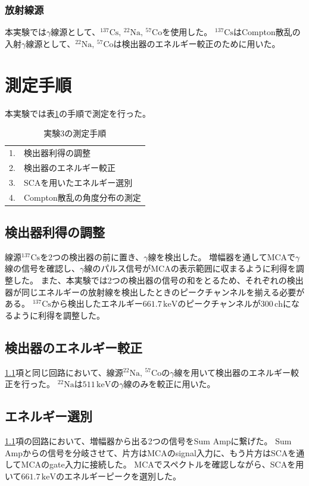 \documentclass[11pt, titlepage, openany]{ltjsbook}
\begin{document}
\subsubsection{放射線源}
本実験では$\gamma$線源として、$\mathrm{^{137}Cs,\,^{22}Na,\,^{57}Co}$を使用した。
$^{137}\mathrm{Cs}$はCompton散乱の入射$\gamma$線源として、$^{22}\mathrm{Na},\,^{57}\mathrm{Co}$は検出器のエネルギー較正のために用いた。
\section{測定手順}
本実験では表\ref{flow3}の手順で測定を行った。
\begin{table}[H]
    \centering
    \begin{tabular}{cl}
        1. & 検出器利得の調整 \\
        2. & 検出器のエネルギー較正 \\
        3. & SCAを用いたエネルギー選別 \\
        4. & Compton散乱の角度分布の測定
    \end{tabular}
    \caption{実験3の測定手順}
    \label{flow3}
\end{table}
\subsection{検出器利得の調整}
\label{gain-adjust}
線源$^{137}\mathrm{Cs}$を2つの検出器の前に置き、$\gamma$線を検出した。
増幅器を通してMCAで$\gamma$線の信号を確認し、$\gamma$線のパルス信号がMCAの表示範囲に収まるように利得を調整した。
また、本実験では2つの検出器の信号の和をとるため、それぞれの検出器が同じエネルギーの放射線を検出したときのピークチャンネルを揃える必要がある。
$^{137}\mathrm{Cs}$から検出したエネルギー$661.7\,\mathrm{keV}$のピークチャンネルが$300\,\mathrm{ch}$になるように利得を調整した。
\subsection{検出器のエネルギー較正}
\ref{gain-adjust}項と同じ回路において、線源$^{22}\mathrm{Na},\,^{57}\mathrm{Co}$の$\gamma$線を用いて検出器のエネルギー較正を行った。
$^{22}\mathrm{Na}$は$511\,\mathrm{keV}$の$\gamma$線のみを較正に用いた。
\subsection{エネルギー選別}
\ref{gain-adjust}項の回路において、増幅器から出る2つの信号をSum Ampに繋げた。
Sum Ampからの信号を分岐させて、片方はMCAのsignal入力に、もう片方はSCAを通してMCAのgate入力に接続した。
MCAでスペクトルを確認しながら、SCAを用いて$661.7\,\mathrm{keV}$のエネルギーピークを選別した。
\end{document}
